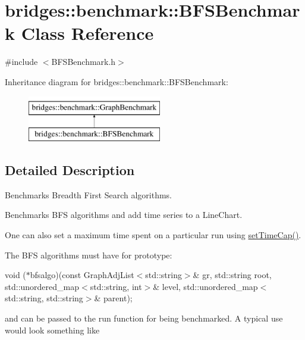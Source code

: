 \hypertarget{classbridges_1_1benchmark_1_1_b_f_s_benchmark}{}\section{bridges\+::benchmark\+::B\+F\+S\+Benchmark Class Reference}
\label{classbridges_1_1benchmark_1_1_b_f_s_benchmark}


{\ttfamily \#include $<$B\+F\+S\+Benchmark.\+h$>$}

Inheritance diagram for bridges\+::benchmark\+::B\+F\+S\+Benchmark\+:\begin{figure}[H]
\begin{center}
\leavevmode
\includegraphics[height=2.000000cm]{classbridges_1_1benchmark_1_1_b_f_s_benchmark}
\end{center}
\end{figure}


\subsection{Detailed Description}
Benchmarks Breadth First Search algorithms. 

Benchmarks B\+FS algorithms and add time series to a Line\+Chart.

One can also set a maximum time spent on a particular run using \mbox{\hyperlink{classbridges_1_1benchmark_1_1_graph_benchmark_a56934eb2789e54c088e7b4423c3a7456}{set\+Time\+Cap()}}.

The B\+FS algorithms must have for prototype\+:

void ($\ast$bfsalgo)(const Graph\+Adj\+List$<$std\+::string$>$\& gr, std\+::string root, std\+::unordered\+\_\+map$<$std\+::string, int$>$\& level, std\+::unordered\+\_\+map$<$std\+::string, std\+::string$>$\& parent);

and can be passed to the run function for being benchmarked. A typical use would look something like


\begin{DoxyCode}{0}
\end{DoxyCode}


